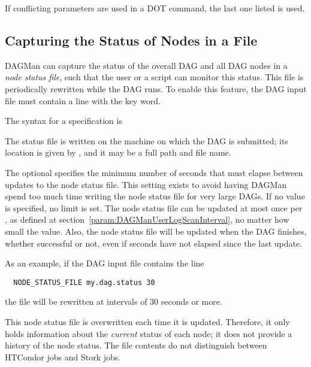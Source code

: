 If conflicting parameters are used in a DOT command, the last one
listed is used.

\subsection{\label{sec:DAG-node-status}Capturing the Status of Nodes in a File}

DAGMan can capture the status of the overall DAG and all DAG nodes
in a \emph{node status file},
such that the user or a script can monitor this status.
This file is periodically rewritten
while the DAG runs.
To enable this feature, the DAG input file must contain a line with the
 key word.

The syntax for a  specification is

  

The status file is written on the machine on which the DAG is submitted;
its location is given by ,
and it may be a full path and file name.

The optional  specifies the minimum number of seconds
that must elapse between updates to the node status file.
This setting exists to avoid having DAGMan spend too much time writing
the node status file for very large DAGs.
If no value is specified, no limit is set.
The node status file can be updated at most once
per ,
as defined at section~\ref{param:DAGManUserLogScanInterval},
no matter how small the  value.
Also, the node status file will be updated when the DAG finishes,
whether successful or not, even if  seconds
have not elapsed since the last update.

As an example, if the DAG input file contains the line
\begin{verbatim}
  NODE_STATUS_FILE my.dag.status 30
\end{verbatim}
the file  will be rewritten at intervals of 30 seconds
or more.

This node status file is overwritten each time it is updated.
Therefore, it only holds information about the \emph{current} status 
of each node; it does not provide a history of the node status.
The file contents do not distinguish between HTCondor jobs and Stork jobs.

